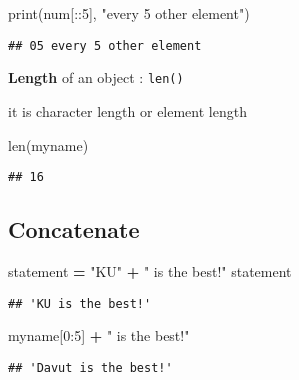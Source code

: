 \documentclass[
]{book}
\newenvironment{Shaded}{\begin{snugshade}}{\end{snugshade}}
\newcommand{\BuiltInTok}[1]{#1}
\newcommand{\DecValTok}[1]{\textcolor[rgb]{0.00,0.00,0.81}{#1}}
\newcommand{\NormalTok}[1]{#1}
\newcommand{\OperatorTok}[1]{\textcolor[rgb]{0.81,0.36,0.00}{\textbf{#1}}}
\newcommand{\StringTok}[1]{\textcolor[rgb]{0.31,0.60,0.02}{#1}}
\begin{document}
\begin{Shaded}
\begin{Highlighting}[]
\BuiltInTok{print}\NormalTok{(num[::}\DecValTok{5}\NormalTok{], }\StringTok{"every 5 other element"}\NormalTok{)}
\end{Highlighting}
\end{Shaded}

\begin{verbatim}
## 05 every 5 other element
\end{verbatim}

\textbf{Length} of an object : \texttt{len()}

it is character length or element length

\begin{Shaded}
\begin{Highlighting}[]
\BuiltInTok{len}\NormalTok{(myname)}
\end{Highlighting}
\end{Shaded}

\begin{verbatim}
## 16
\end{verbatim}

\hypertarget{concatenate}{%
\subsection{Concatenate}\label{concatenate}}

\begin{Shaded}
\begin{Highlighting}[]
\NormalTok{statement }\OperatorTok{=} \StringTok{"KU"} \OperatorTok{+} \StringTok{" is the best!"}  
\NormalTok{statement}
\end{Highlighting}
\end{Shaded}

\begin{verbatim}
## 'KU is the best!'
\end{verbatim}

\begin{Shaded}
\begin{Highlighting}[]
\NormalTok{myname[}\DecValTok{0}\NormalTok{:}\DecValTok{5}\NormalTok{] }\OperatorTok{+} \StringTok{" is the best!"}
\end{Highlighting}
\end{Shaded}

\begin{verbatim}
## 'Davut is the best!'
\end{verbatim}
\end{document}
